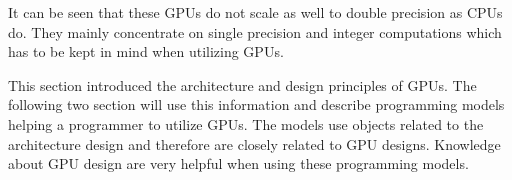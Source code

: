   It can be seen that these GPUs do not scale as well to double precision as CPUs do.
  They mainly concentrate on single precision and integer computations which has to be kept in mind when utilizing GPUs.

  \vspace{0.5cm}
  This section introduced the architecture and design principles of GPUs.
  The following two section will use this information and describe programming models helping a programmer to utilize GPUs.
  The models use objects related to the architecture design and therefore are closely related to GPU designs.
  Knowledge about GPU design are very helpful when using these programming models.
  